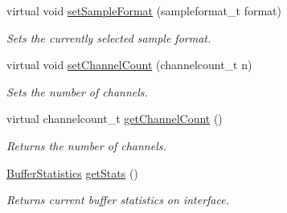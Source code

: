 \begin{DoxyCompactItemize}
virtual void \hyperlink{classNl_1_1AudioAlsa_adfd02364854decfdae10f1dcfcf5292d}{set\-Sample\-Format} (sampleformat\-\_\-t format)
\begin{DoxyCompactList}\small\item\em Sets the currently selected sample format. \end{DoxyCompactList}\item 
virtual void \hyperlink{classNl_1_1AudioAlsa_aad4859e60c5b2f393224d9fe8728bd74}{set\-Channel\-Count} (channelcount\-\_\-t n)
\begin{DoxyCompactList}\small\item\em Sets the number of channels. \end{DoxyCompactList}\item 
virtual channelcount\-\_\-t \hyperlink{classNl_1_1AudioAlsa_aad8e4064dc35ecba3e0ce74a7d10e8a8}{get\-Channel\-Count} ()
\begin{DoxyCompactList}\small\item\em Returns the number of channels. \end{DoxyCompactList}\item 
\hyperlink{structNl_1_1BufferStatistics}{Buffer\-Statistics} \hyperlink{group__Audio_gad2391af4ccb27cc7e27a263a73d68a76}{get\-Stats} ()
\begin{DoxyCompactList}\small\item\em Returns current buffer statistics on interface. \end{DoxyCompactList}\end{DoxyCompactItemize}
